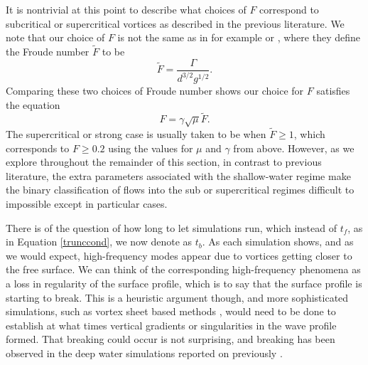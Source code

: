 \documentclass[a4paper,11pt]{article}
\begin{document}
It is nontrivial at this point to describe what choices of $F$ correspond to subcritical or supercritical vortices as described in the previous literature.  We note that our choice of $F$ is not the same as in for example \cite{tyvand1} or \cite{telste}, where they define the Froude number $\tilde{F}$ to be  
\[
\tilde{F} = \frac{\Gamma}{d^{3/2}g^{1/2}}.
\] 
Comparing these two choices of Froude number shows our choice for $F$ satisfies the equation 
\[
F = \gamma\sqrt{\mu}\tilde{F}.
\]  
The supercritical or strong case is usually taken to be when $\tilde{F}\geq 1$, which corresponds to $F\geq 0.2$ using the values for $\mu$ and $\gamma$ from above.  However, as we explore throughout the remainder of this section, in contrast to previous literature, the extra parameters associated with the shallow-water regime make the binary classification of flows into the sub or supercritical regimes difficult to impossible except in particular cases.   

There is of the question of how long to let simulations run, which instead of $t_{f}$, as in Equation \eqref{trunccond}, we now denote as $t_{b}$.  As each simulation shows, and as we would expect, high-frequency modes appear due to vortices getting closer to the free surface.  We can think of the corresponding high-frequency phenomena as a loss in regularity of the surface profile, which is to say that the surface profile is starting to break.  This is a heuristic argument though, and more sophisticated simulations, such as vortex sheet based methods \cite{telste,baker}, would need to be done to establish at what times vertical gradients or singularities in the wave profile formed.  That breaking could occur is not surprising, and breaking has been observed in the deep water simulations reported on previously \cite{marcus}.  
\end{document}
